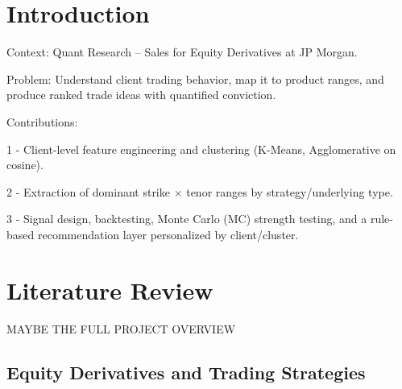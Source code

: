 \documentclass[12pt,a4paper]{report}
\begin{document}
\begin{titlepage}
\end{titlepage}


\newpage %



\tableofcontents

\chapter*{Introduction}

Context: Quant Research – Sales for Equity Derivatives at JP Morgan.

Problem: Understand client trading behavior, map it to product ranges, and produce ranked trade ideas with quantified conviction.

Contributions:

1 - Client-level feature engineering and clustering (K-Means, Agglomerative on cosine).

2 - Extraction of dominant strike × tenor ranges by strategy/underlying type.

3 - Signal design, backtesting, Monte Carlo (MC) strength testing, and a rule-based recommendation layer personalized by client/cluster.

\chapter{Literature Review}

MAYBE THE FULL PROJECT OVERVIEW 

\section{Equity Derivatives and Trading Strategies}
\end{document}
